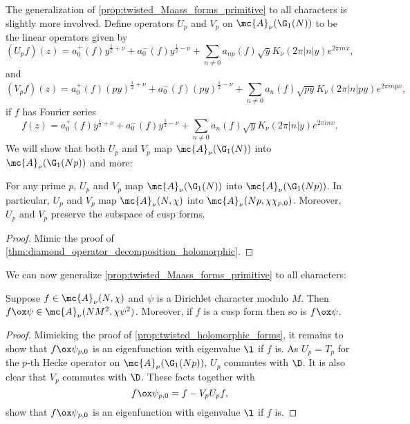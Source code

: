     The generalization of \cref{prop:twisted_Maass_forms_primitive} to all characters is slightly more involved. Define operators $U_{p}$ and $V_{p}$ on $\mc{A}_{\nu}(\G_{1}(N))$ to be the linear operators given by
    \[
      (U_{p}f)(z) = a_{0}^{+}(f)y^{\frac{1}{2}+\nu}+a_{0}^{-}(f)y^{\frac{1}{2}-\nu}+\sum_{n \neq 0}a_{np}(f)\sqrt{y}K_{\nu}(2\pi|n|y)e^{2\pi inx},
    \]
    and
    \[
      (V_{p}f)(z) = a_{0}^{+}(f)(py)^{\frac{1}{2}+\nu}+a_{0}^{-}(f)(py)^{\frac{1}{2}-\nu}+\sum_{n \neq 0}a_{n}(f)\sqrt{py}K_{\nu}(2\pi|n|py)e^{2\pi inpx},
    \]
    if $f$ has Fourier series
    \[
      f(z) = a_{0}^{+}(f)y^{\frac{1}{2}+\nu}+a_{0}^{-}(f)y^{\frac{1}{2}-\nu}+\sum_{n \neq 0}a_{n}(f)\sqrt{y}K_{\nu}(2\pi|n|y)e^{2\pi inx}.
    \]
    We will show that both $U_{p}$ and $V_{p}$ map $\mc{A}_{\nu}(\G_{1}(N))$ into $\mc{A}_{\nu}(\G_{1}(Np))$ and more:

    \begin{lemma}\label{lem:twisted_Maass_lemma}
      For any prime $p$, $U_{p}$ and $V_{p}$ map $\mc{A}_{\nu}(\G_{1}(N))$ into $\mc{A}_{\nu}(\G_{1}(Np))$. In particular, $U_{p}$ and $V_{p}$ map $\mc{A}_{\nu}(N,\chi)$ into $\mc{A}_{\nu}(Np,\chi\chi_{p,0})$. Moreover, $U_{p}$ and $V_{p}$ preserve the subspace of cusp forms.
    \end{lemma}
    \begin{proof}
      Mimic the proof of \cref{thm:diamond_operator_decomposition_holomorphic}.
    \end{proof}

    We can now generalize \cref{prop:twisted_Maass_forms_primitive} to all characters:

    \begin{proposition}\label{prop:twisted_Maass_forms}
      Suppose $f \in \mc{A}_{\nu}(N,\chi)$ and $\psi$ is a Dirichlet character modulo $M$. Then $f \ox \psi \in \mc{A}_{\nu}(NM^{2},\chi\psi^{2})$. Moreover, if $f$ is a cusp form then so is $f \ox \psi$.
    \end{proposition}
    \begin{proof}
      Mimicking the proof of \cref{prop:twisted_holomorphic_forms}, it remains to show that $f \ox \psi_{p,0}$ is an eigenfunction with eigenvalue $\l$ if $f$ is. As $U_{p} = T_{p}$ for the $p$-th Hecke operator on $\mc{A}_{\nu}(\G_{1}(Np))$, $U_{p}$ commutes with $\D$. It is also clear that $V_{p}$ commutes with $\D$. These facts together with
      \[
        f \ox \psi_{p,0} = f-V_{p}U_{p}f,
      \]
      show that $f \ox \psi_{p,0}$ is an eigenfunction with eigenvalue $\l$ if $f$ is.
    \end{proof}